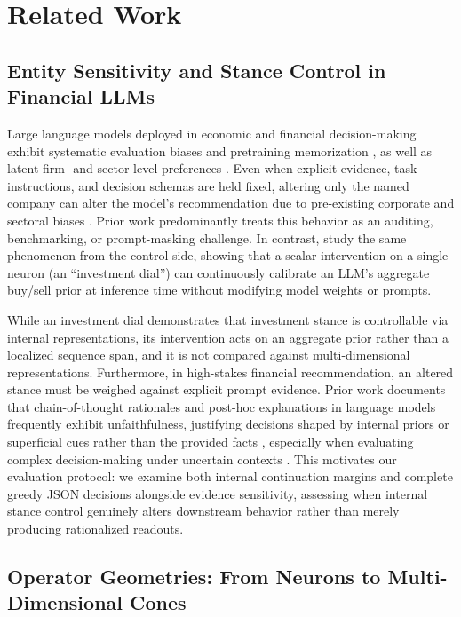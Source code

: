 \documentclass[11pt]{article}
\begin{document}
\section{Related Work}

\subsection{Entity Sensitivity and Stance Control in Financial LLMs}

Large language models deployed in economic and financial decision-making exhibit systematic
evaluation biases and pretraining memorization \citep{lopezlira2025memorization,kong2026evaluating},
as well as latent firm- and sector-level preferences \citep{lee2026your}.
Even when explicit evidence, task instructions, and decision schemas are held fixed, altering only
the named company can alter the model's recommendation due to pre-existing corporate and sectoral
biases \citep{hu2026finbias,elbouanani2026scalable}. Prior work predominantly treats this behavior as an
auditing, benchmarking, or prompt-masking challenge. In contrast, \citet{park2026dial} study the
same phenomenon from the control side, showing that a scalar intervention on a single neuron
(an ``investment dial'') can continuously calibrate an LLM's aggregate buy/sell prior at inference
time without modifying model weights or prompts.

While an investment dial demonstrates that investment stance is controllable via internal
representations, its intervention acts on an aggregate prior rather than a localized sequence span,
and it is not compared against multi-dimensional representations. Furthermore, in high-stakes
financial recommendation, an altered stance must be weighed against explicit prompt evidence.
Prior work documents that chain-of-thought rationales and post-hoc explanations in language models
frequently exhibit unfaithfulness, justifying decisions shaped by internal priors or superficial
cues rather than the provided facts \citep{turpin2023language}, especially when evaluating complex
decision-making under uncertain contexts \citep{jia2024decision}. This motivates our evaluation
protocol: we examine both internal continuation margins and complete greedy JSON decisions alongside
evidence sensitivity, assessing when internal stance control genuinely alters downstream behavior
rather than merely producing rationalized readouts.

\subsection{Operator Geometries: From Neurons to Multi-Dimensional Cones}
\end{document}
